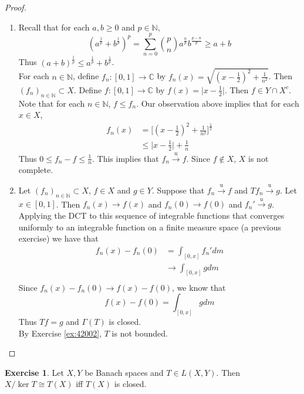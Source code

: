 \documentclass[12pt]{amsart}
\theoremstyle{definition}
\newtheorem{ex}[definition]{Exercise}
\newcommand{\Gam}{\Gamma}
\newcommand{\C}{\mathbb{C}}
\newcommand{\N}{\mathbb{N}}
\newcommand{\convt}[1]{\xrightarrow{\text{#1}}}
\newcommand{\conv}[1]{\xrightarrow{#1}}
\newcommand{\lex}[1]{\label{ex:#1}}
\newcommand{\rex}[1]{Exercise \ref{ex:#1}}
\begin{document}
	\begin{proof}
		\begin{enumerate}
			\item Recall that for each $a,b \geq 0$ and $p \in \N$, $$(a^{\frac{1}{p}}+b^{\frac{1}{p}})^p = \sum_{n=0}^p  {p \choose n} a^{\frac{n}{p}}b^{\frac{p-n}{p}} \geq a + b$$ Thus $(a+b)^{\frac{1}{p}} \leq a^{\frac{1}{p}}+b^{\frac{1}{p}}$.\\
			For each $n \in \N$, define $f_n: [0,1] \rightarrow \C$ by $f_n(x) = \sqrt{(x-\frac{1}{2})^2+ \frac{1}{n^2}}$. Then $(f_n)_{n \in \N} \subset X$. Define $f:[0,1] \rightarrow \C$ by $f(x) = \vert x-\frac{1}{2}\vert$. Then $f \in Y \cap X^c$. Note that for each $n \in \N$, $f \leq f_n$. Our observation above implies that for each $x \in X$,
			\begin{align*}
				f_n(x) 
				&= \bigg[ (x-\frac{1}{2})^2 + \frac{1}{n^2} \bigg]^{\frac{1}{2}}\\
				& \leq \vert x-\frac{1}{2} \vert + \frac{1}{n}
			\end{align*}
			Thus $0 \leq f_n - f \leq \frac{1}{n} $. This implies that $f_n \convt{u} f$. Since $f \not \in X$, $X$ is not complete. \vspace{.5cm}\\
			\item Let $(f_n)_{n \in \N} \subset X$, $f \in X$ and $g \in Y$. Suppose that $f_n \convt{u} f$ and $Tf_n \convt{u} g$. Let $x \in [0,1]$. Then $f_n(x) \conv{} f(x)$ and $f_n(0) \conv{} f(0)$ and $f_n' \conv{u} g$. Applying the DCT to this sequence of integrable functions that converges uniformly to an integrable function on a finite measure space (a previous exercise) we have that
			\begin{align*}
				f_n(x) - f_n(0) 
				&= \int_{[0,x]} f_n' dm \\
				& \rightarrow \int_{[0,x]} g dm \\ 
			\end{align*} 
			Since $f_n(x) - f_n(0) \conv{} f(x) - f(0)$, we know that $$f(x) - f(0) = \int_{[0,x]} g dm$$ Thus $Tf = g$ and $\Gam(T)$ is closed. \\
			By \rex{42002}, $T$ is not bounded.
		\end{enumerate}
	\end{proof}
	
	\begin{ex} \lex{}
		Let $X, Y$ be Banach spaces and $T \in L(X,Y)$. Then $X/\ker T \cong T(X)$ iff $T(X)$ is closed.
	\end{ex}
	
\end{document}
